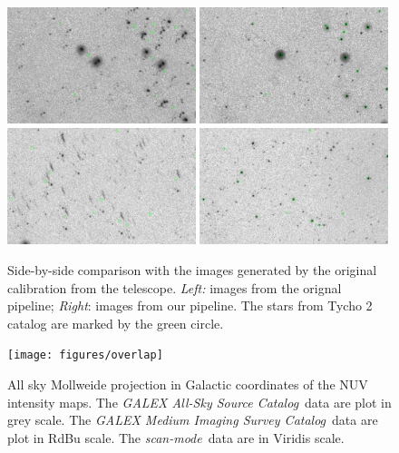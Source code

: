 \documentclass[12pt, preprint]{aastex}
\newcommand{\project}[1]{\textsl{#1}}
\newcommand{\asc}{\project{GALEX All-Sky Source Catalog}}
\newcommand{\msc}{\project{GALEX Medium Imaging Survey Catalog}}
\newcommand{\scanmode}{\project{scan-mode}}
\begin{document}
\begin{figure}[p]
\begin{center}
\includegraphics[width=0.49\textwidth]{figures/pip0}
\includegraphics[width=0.49\textwidth]{figures/cal0}
\includegraphics[width=0.49\textwidth]{figures/pip1}
\includegraphics[width=0.49\textwidth]{figures/cal1}
\end{center}
\caption{
  \label{map2}
  Side-by-side comparison with the images generated by the original calibration from the telescope.
  \emph{Left:} images from the orignal pipeline;
  \emph{Right}: images from our pipeline.
  The stars from Tycho 2 catalog are marked by the green circle.
}
\end{figure}

\begin{figure}[p]
\begin{center}
\texttt{[image: figures/overlap]}
\end{center}
\caption{
  \label{map3}
  All sky Mollweide projection in Galactic coordinates of the NUV intensity maps.
  The \asc\ data are plot in grey scale.
  The \msc\ data are plot in RdBu scale.
  The \scanmode\ data are in Viridis scale. 
}
\end{figure}
\end{document}

